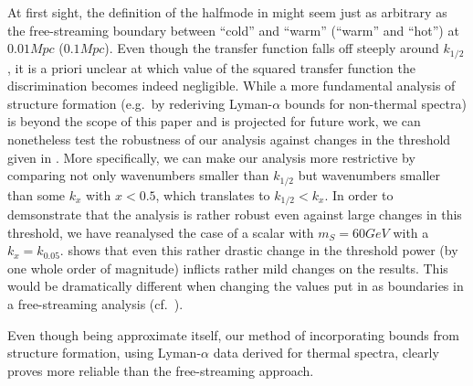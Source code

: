 At first sight, the definition of the halfmode in  might seem just as arbitrary as the free-streaming boundary between ``cold'' and ``warm'' (``warm'' and ``hot'') at $\unit{0.01}{Mpc}$ ($\unit{0.1}{Mpc}$). Even though the transfer function falls off steeply around $k_{1/2}$, it is a priori unclear at which value of the squared transfer function the discrimination becomes indeed negligible. While a more fundamental analysis of structure formation (e.g.~by rederiving Lyman-$\alpha$ bounds for non-thermal spectra) is beyond the scope of this paper and is projected for future work, we can nonetheless test the robustness of our analysis against changes in the threshold given in . More specifically, we can make our analysis more restrictive by comparing not only wavenumbers smaller than $k_{1/2}$ but wavenumbers smaller than some $k_x$ with $x < 0.5$, which translates to $k_{1/2} < k_x$. In order to demsonstrate that the analysis is rather robust even against large changes in this threshold, we have reanalysed the case of a scalar with $m_S = \unit{60}{GeV}$ with a $k_x=k_{0.05}$.  shows that even this rather drastic change in the threshold power (by one whole order of magnitude) inflicts rather mild changes on the results. This would be dramatically different when changing the values put in as boundaries in a free-streaming analysis (cf.~). 

Even though being approximate itself, our method of incorporating bounds from structure formation, using Lyman-$\alpha$ data derived for thermal spectra, clearly proves more reliable than the free-streaming approach.